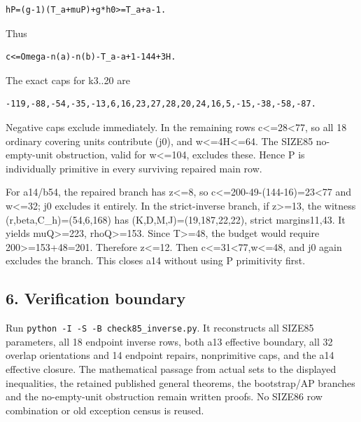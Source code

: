 \documentclass[10pt,a4paper]{article}
\theoremstyle{definition}
\begin{document}
\begin{lstlisting}
hP=(g-1)(T_a+muP)+g*h0>=T_a+a-1.
\end{lstlisting}

Thus

\begin{lstlisting}
c<=Omega-n(a)-n(b)-T_a-a+1-144+3H.
\end{lstlisting}

The exact caps for k3..20 are

\begin{lstlisting}
-119,-88,-54,-35,-13,6,16,23,27,28,20,24,16,5,-15,-38,-58,-87.
\end{lstlisting}

Negative caps exclude immediately. In the remaining rows
c\textless=\allowbreak{}28\textless77,\allowbreak{} so all 18 ordinary covering units contribute
(j0),\allowbreak{} and w\textless=\allowbreak{}4H\textless=\allowbreak{}64. The SIZE85 no-empty-unit
obstruction,\allowbreak{} valid for w\textless=\allowbreak{}104,\allowbreak{} excludes these. Hence P is
individually primitive in every surviving repaired main row.

For a14/b54,\allowbreak{} the repaired branch has z\textless=\allowbreak{}8,\allowbreak{} so
c\textless=\allowbreak{}200-49-(144-16)=\allowbreak{}23\textless77 and w\textless=\allowbreak{}32; j0 excludes
it entirely. In the strict-inverse branch,\allowbreak{} if z\textgreater=\allowbreak{}13,\allowbreak{} the
witness (r,\allowbreak{}beta,\allowbreak{}C\_\allowbreak{}h)=\allowbreak{}(54,\allowbreak{}6,\allowbreak{}168) has (K,\allowbreak{}D,\allowbreak{}M,\allowbreak{}J)=\allowbreak{}(19,\allowbreak{}187,\allowbreak{}22,\allowbreak{}22),\allowbreak{} strict
margins11,\allowbreak{}43. It yields muQ\textgreater=\allowbreak{}223,\allowbreak{} rhoQ\textgreater=\allowbreak{}153. Since
T\textgreater=\allowbreak{}48,\allowbreak{} the budget would require 200\textgreater=\allowbreak{}153+\allowbreak{}48=\allowbreak{}201.
Therefore z\textless=\allowbreak{}12. Then c\textless=\allowbreak{}31\textless77,\allowbreak{}w\textless=\allowbreak{}48,\allowbreak{}
and j0 again excludes the branch. This closes a14 without using P
primitivity first.

\hypertarget{verification-boundary}{%
\subsection{6. Verification boundary}\label{verification-boundary}}

Run \texttt{python -I -S -B check85\_\allowbreak{}\allowbreak{}inverse.py}. It
reconstructs all SIZE85 parameters,\allowbreak{} all 18 endpoint inverse rows,\allowbreak{} both
a13 effective boundary,\allowbreak{} all 32 overlap orientations and 14 endpoint
repairs,\allowbreak{} nonprimitive caps,\allowbreak{} and the a14 effective closure. The
mathematical passage from actual sets to the displayed inequalities,\allowbreak{} the
retained published general theorems,\allowbreak{} the bootstrap/AP branches and the
no-empty-unit obstruction remain written proofs. No SIZE86 row
combination or old exception census is reused.
\end{document}
